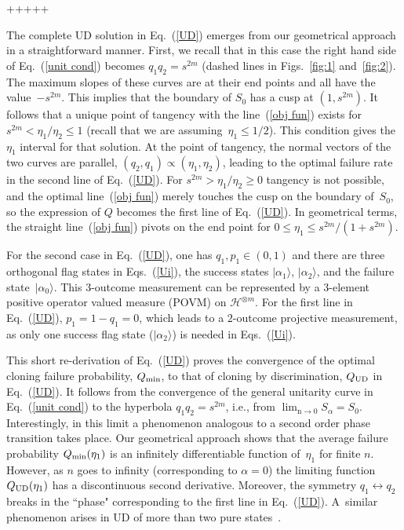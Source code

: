 \documentclass[aps,prl,twocolumn,showpacs]{revtex4}
\begin{document}
+++++

The complete UD solution in Eq.~(\ref{UD}) emerges from our geometrical approach in a straightforward manner. First, we recall that in this case the right hand side of Eq.~(\ref{unit cond}) becomes $q_1 q_2=s^{2m}$ (dashed lines in Figs.~\ref{fig:1} and~\ref{fig:2}). The maximum slopes of these curves are at their end points and all have the value~$-s^{2m}$. This implies that the boundary of $S_0$ has a cusp at $(1,s^{2m})$. It follows that a unique point of tangency with the line~(\ref{obj fun}) exists for $s^{2m}<\eta_1/\eta_2\le1$ (recall that we are assuming~$\eta_1\le1/2$). This condition gives the $\eta_1$ interval for that solution.  At the point of tangency, the normal vectors of the two curves are parallel, $(q_2,q_1)\propto (\eta_1,\eta_2)$, leading to the optimal failure rate in the second line of Eq.~(\ref{UD}). For $s^{2m}>\eta_1/\eta_2\ge0$ tangency is not possible, and the optimal line~(\ref{obj fun}) merely touches the cusp on the boundary of~$S_0$, so the expression of $Q$ becomes the first line of Eq.~(\ref{UD}). In geometrical terms, the straight line~(\ref{obj fun}) pivots on the end point for $0 \leq \eta_1 \leq s^{2m}/(1+s^{2m})$.

For the second case in Eq.~(\ref{UD}), one has $q_1,p_1\in(0,1)$ and there are three orthogonal flag states in Eqs.~(\ref{Ui}), the success states $|\alpha_1\rangle$, $|\alpha_2\rangle$, and the failure state~$|\alpha_{0}\rangle$. This $3$-outcome measurement can be represented by a $3$-element positive operator valued measure (POVM) on ${\mathscr H}^{\otimes m}$. For the first line in Eq.~(\ref{UD}), $p_1=1-q_1=0$, which leads to a $2$-outcome projective measurement, as only one success flag state ($|\alpha_2\rangle$) is needed in Eqs.~(\ref{Ui}). 

This short re-derivation of Eq.~(\ref{UD}) proves the convergence of the optimal cloning failure probability, $Q_{\rm min}$, to that of cloning by discrimination, $Q_{\rm UD}$ in Eq.~(\ref{UD}). It follows from the convergence of the general unitarity curve in Eq.~(\ref{unit cond}) to the hyperbola $q_1q_2=s^{2m}$, i.e., from $\lim_{{\mathrm n}\to 0} S_\alpha=S_0$. Interestingly, in this limit a phenomenon analogous to a second order phase transition takes place. Our geometrical approach shows that the average failure probability $Q_{\rm min}(\eta_1)$ is an infinitely differentiable function of~$\eta_1$ for finite $n$. However, as $n$ goes to infinity (corresponding to $\alpha=0$) the limiting function $Q_{\rm UD}(\eta_1)$ has a discontinuous second derivative. Moreover, the symmetry $q_1\leftrightarrow q_2$ breaks  in the ``phase" corresponding to the first line in Eq.~(\ref{UD}). A~similar phenomenon arises in UD of more than two pure states~\cite{Bergou1}.
\end{document}
